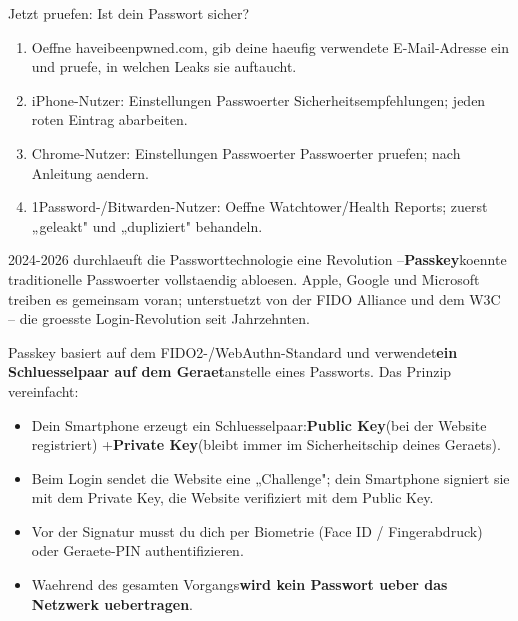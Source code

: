 \begin{tcbpractice}{Jetzt pruefen: Ist dein Passwort sicher?}
\begin{enumerate}
  \item Oeffne haveibeenpwned.com, gib deine haeufig verwendete E-Mail-Adresse ein und pruefe, in welchen Leaks sie auftaucht.
  \item iPhone-Nutzer: Einstellungen Passwoerter Sicherheitsempfehlungen; jeden roten Eintrag abarbeiten.
  \item Chrome-Nutzer: Einstellungen Passwoerter Passwoerter pruefen; nach Anleitung aendern.
  \item 1Password-/Bitwarden-Nutzer: Oeffne Watchtower/Health Reports; zuerst „geleakt" und „dupliziert" behandeln.
\end{enumerate}

\end{tcbpractice}


2024-2026 durchlaeuft die Passworttechnologie eine Revolution –\textbf{Passkey}koennte traditionelle Passwoerter vollstaendig abloesen. Apple, Google und Microsoft treiben es gemeinsam voran; unterstuetzt von der FIDO Alliance und dem W3C – die groesste Login-Revolution seit Jahrzehnten.


Passkey basiert auf dem FIDO2-/WebAuthn-Standard und verwendet\textbf{ein Schluesselpaar auf dem Geraet}anstelle eines Passworts. Das Prinzip vereinfacht:

\begin{itemize}
  \item Dein Smartphone erzeugt ein Schluesselpaar:\textbf{Public Key}(bei der Website registriert) +\textbf{Private Key}(bleibt immer im Sicherheitschip deines Geraets).
  \item Beim Login sendet die Website eine „Challenge"; dein Smartphone signiert sie mit dem Private Key, die Website verifiziert mit dem Public Key.
  \item Vor der Signatur musst du dich per Biometrie (Face ID / Fingerabdruck) oder Geraete-PIN authentifizieren.
  \item Waehrend des gesamten Vorgangs\textbf{wird kein Passwort ueber das Netzwerk uebertragen}.
\end{itemize}


